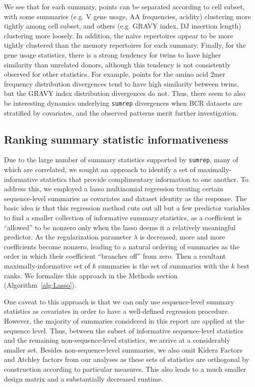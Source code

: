 \documentclass{article}
\begin{document}
We see that for each summary, points can be separated according to cell subset, with some summaries (e.g. V gene usage, AA frequencies, acidity) clustering more tightly among cell subset, and others (e.g. GRAVY index, DJ insertion length) clustering more loosely.
In addition, the naive repertoires appear to be more tightly clustered than the memory repertoires for each summary.
Finally, for the gene usage statistics, there is a strong tendency for twins to have higher similarity than unrelated donors, although this tendency is not consistently observed for other statistics.
For example, points for the amino acid 2mer frequency distribution divergences tend to have high similarity between twins, but the GRAVY index distribution divergences do not.
Thus, there seem to also be interesting dynamics underlying \texttt{sumrep} divergences when BCR datasets are stratified by covariates, and the observed patterns merit further investigation.

\subsection*{Ranking summary statistic informativeness}
Due to the large number of summary statistics supported by \texttt{sumrep}, many of which are correlated, we sought an approach to identify a set of maximally-informative statistics that provide complimentary information to one another.
To address this, we employed a lasso multinomial regression treating certain sequence-level summaries as covariates and dataset identity as the response.
The basic idea is that this regression method cuts out all but a few predictor variables to find a smaller collection of informative summary statistics, as a coefficient is ``allowed'' to be nonzero only when the lasso deems it a relatively meaningful predictor.
As the regularization parameter $\lambda$ is decreased, more and more coefficients  become nonzero, leading to a natural ordering of summaries as the order in which their coefficient ``branches off'' from zero.
Then a resultant maximally-informative set of $k$ summaries is the set of summaries with the $k$ best ranks.
We formalize this approach in the Methods section (Algorithm~\ref{alg:Lasso}).

One caveat to this approach is that we can only use sequence-level summary statistics as covariates in order to have a well-defined regression procedure.
However, the majority of summaries considered in this report are applied at the sequence level.
Thus, between the subset of informative sequence-level statistics and the remaining non-sequence-level statistics, we arrive at a considerably smaller set.
Besides non-sequence-level summaries, we also omit Kidera Factors and Atchley factors from our analyses as these sets of statistics are orthogonal by construction according to particular measures.
This also leads to a much smaller design matrix and a substantially decreased runtime.
\end{document}
